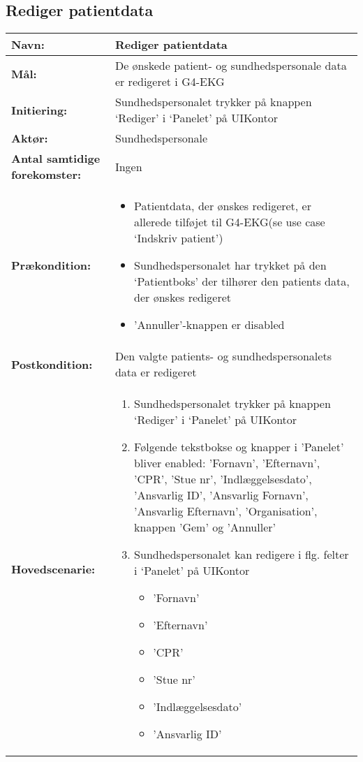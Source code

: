 \subsection{Rediger patientdata}
\begin{table}[H]
\begin{tabular}{|l|p{10cm}|}
\hline
\textbf{Navn:} & \textbf{Rediger patientdata}\\\hline
\textbf{Mål:} & De ønskede patient- og sundhedspersonale data er redigeret i G4-EKG \\\hline
\textbf{Initiering:} & Sundhedspersonalet trykker på knappen ‘Rediger’ i ‘Panelet’ på UIKontor \\\hline
\textbf{Aktør:} & Sundhedspersonale \\\hline
\textbf{Antal samtidige forekomster:} & Ingen \\\hline
\textbf{Prækondition:} & \begin{itemize}[label=$\circ$]
\item{Patientdata, der ønskes redigeret, er allerede tilføjet til G4-EKG(se use case ‘Indskriv patient’)}
\item{Sundhedspersonalet har trykket på den ‘Patientboks’ der tilhører den patients data, der ønskes redigeret}
\item{'Annuller'-knappen er disabled }
\end{itemize}
\\\hline
\textbf{Postkondition:} & Den valgte patients- og sundhedspersonalets data er redigeret\\\hline
\textbf{Hovedscenarie:} &
\begin{enumerate}
\item{Sundhedspersonalet trykker på knappen ‘Rediger’ i ‘Panelet’ på UIKontor}
\item{Følgende tekstbokse og knapper i 'Panelet' bliver enabled: 'Fornavn', 'Efternavn', 'CPR', 'Stue nr', 'Indlæggelsesdato', 'Ansvarlig ID', 'Ansvarlig Fornavn', 'Ansvarlig Efternavn', 'Organisation', knappen 'Gem' og 'Annuller'}
\item{Sundhedspersonalet kan redigere i flg. felter i ‘Panelet’ på UIKontor \begin{itemize}[label=$\circ$]
\item{'Fornavn'}
\item{'Efternavn'}
\item{'CPR'}
\item{'Stue nr'}
\item{'Indlæggelsesdato'}
\item{'Ansvarlig ID'}

\end{itemize}}
\end{enumerate}
\end{tabular}
\end{table}
